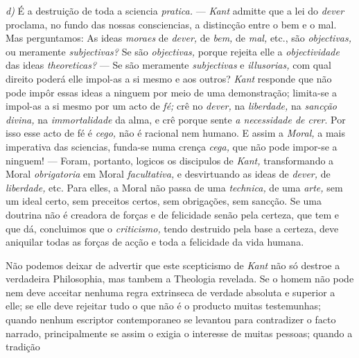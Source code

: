 \emph{d)} É a destruição de toda a sciencia \emph{pratica.} --- \emph{Kant} admitte que a lei do \emph{dever} proclama, no fundo das nossas consciencias, a distincção entre o bem e o mal. Mas perguntamos: As ideas \emph{moraes} de \emph{dever,} de \emph{bem,} de \emph{mal,} etc., são \emph{objectivas,} ou meramente \emph{subjectivas?} Se são \emph{objectivas,} porque rejeita elle a \emph{objectividade} das ideas \emph{theoreticas?} --- Se são meramente \emph{subjectivas} e \emph{illusorias,} com qual direito poderá elle impol-as a si mesmo e aos outros? \emph{Kant} responde que não pode impôr essas ideas a ninguem por meio de uma demonstração; limita-se a impol-as a si mesmo por um acto de \emph{fé;} crê no \emph{dever,} na \emph{liberdade,} na \emph{sancção divina,} na \emph{immortalidade} da alma, e crê porque sente \emph{a necessidade de crer}. Por isso esse acto de fé é \emph{cego,} não é racional nem humano. E assim a \emph{Moral,} a mais imperativa das sciencias, funda-se numa crença \emph{cega,} que não pode impor-se a ninguem! --- Foram, portanto, logicos os discipulos de \emph{Kant,} transformando a Moral \emph{obrigatoria} em Moral \emph{facultativa,} e desvirtuando as ideas de \emph{dever,} de \emph{liberdade,} etc. Para elles, a Moral não passa de uma \emph{technica,} de uma \emph{arte,} sem um ideal certo, sem preceitos certos, sem obrigações, sem sancção. Se uma doutrina não é creadora de forças e de felicidade senão pela certeza, que tem e que dá, concluimos que o \emph{criticismo,} tendo destruido pela base a certeza, deve aniquilar todas as forças de acção e toda a felicidade da vida humana.

Não podemos deixar de advertir que este scepticismo de \emph{Kant} não só destroe a verdadeira Philosophia, mas tambem a Theologia revelada. Se o homem não pode nem deve acceitar nenhuma regra extrinseca de verdade absoluta e superior a elle; se elle deve rejeitar tudo o que não é o producto   muitas testemunhas; quando nenhum escriptor contemporaneo se levantou para contradizer o facto narrado, principalmente se assim o exigia o interesse de muitas pessoas; quando a tradição

